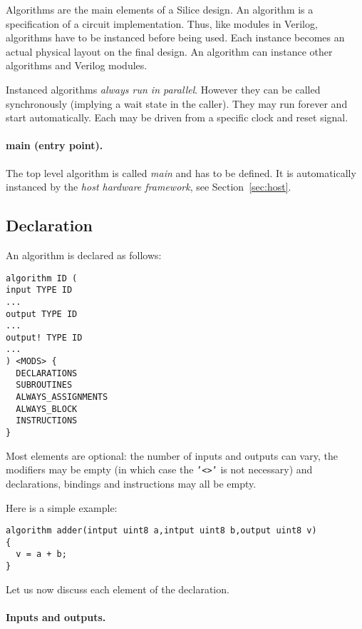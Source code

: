\documentclass[a4]{article}
\newcommand\verilog{Verilog}
\newcommand\silice{Silice}
\begin{document}
Algorithms are the main elements of a \silice{} design. An algorithm is a specification of a circuit implementation. Thus, like modules in \verilog{}, algorithms have to be instanced before being used. Each instance becomes an actual physical layout on the final design.
An algorithm can instance other algorithms and \verilog{} modules. 

Instanced algorithms \textit{always run in parallel}. However they can be called synchronously (implying a wait state in the caller). They may run forever and start automatically. Each may be driven from a specific clock and reset signal.

\paragraph{main (entry point).}
The top level algorithm is called \textit{main} and has to be defined. It is automatically instanced by the \textit{host hardware framework}, see Section~\ref{sec:host}.


\subsection{Declaration}

An algorithm is declared as follows:
\begin{verbatim}
algorithm ID (
input TYPE ID
...
output TYPE ID
...
output! TYPE ID
...
) <MODS> {
  DECLARATIONS
  SUBROUTINES
  ALWAYS_ASSIGNMENTS
  ALWAYS_BLOCK
  INSTRUCTIONS
}
\end{verbatim}

Most elements are optional: the number of inputs and outputs can vary, the modifiers may be empty (in which case the \texttt{'<>'} is not necessary) and declarations, bindings and instructions may all be empty.

Here is a simple example:
\begin{verbatim}
algorithm adder(intput uint8 a,intput uint8 b,output uint8 v)
{
  v = a + b;
}
\end{verbatim}

\noindent Let us now discuss each element of the declaration.


\paragraph{Inputs and outputs.}
\end{document}
